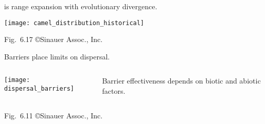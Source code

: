 \documentclass[t]{beamer}
\begin{document}
%
\begin{frame}[t]{ is range expansion with evolutionary divergence.}

	\vspace*{-0.5\baselineskip}
	{\centering
	\texttt{[image: camel\_distribution\_historical]}\par
	}
	
	\vfilll
	
\end{frame}
%
{
\begin{frame}[b]

	\hfill \tiny Fig.~6.17 \copyright Sinauer Assoc., Inc.
\end{frame}
}
%
\begin{frame}[t]{Barriers place limits on dispersal.}

	\vspace*{-1\baselineskip}
	
	\begin{columns}
		\begin{column}{0.6\textwidth}
		
		\texttt{[image: dispersal\_barriers]}
		\end{column}
		
		\begin{column}{0.35\textwidth}
		
		\hangpara {}

		\hangpara {}

		\hangpara Barrier effectiveness depends on biotic and abiotic factors.
		\end{column}
	\end{columns}
	
	\hfill \tiny Fig.~6.11 \copyright Sinauer Assoc., Inc.
\end{frame}
%
\end{document}
